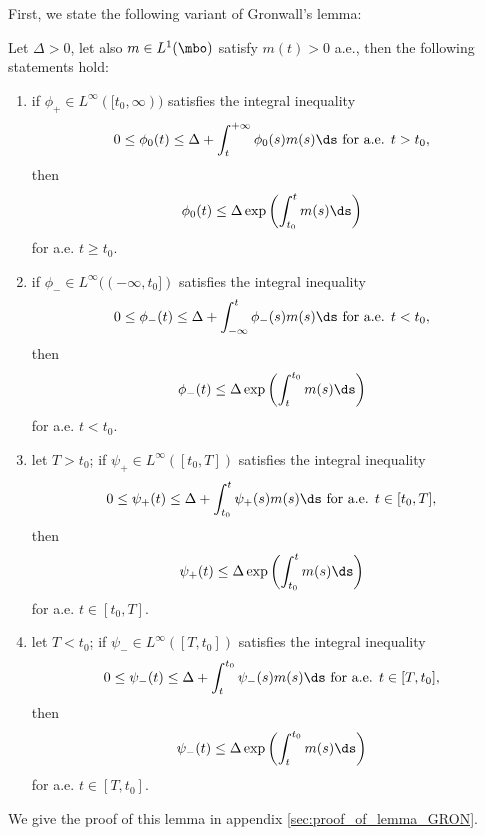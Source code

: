 First, we state the following variant of Gronwall's lemma:
\begin{lemma}
\label{le:gron} Let $\Delta>0$, let also $m\in L^1(\mbo)$ satisfy $m(t)>0$ a.e., then the following statements hold:
\begin{enumerate}
	\item
	if $\phi_+ \in L^{\infty}([t_0,\infty))$ satisfies the integral inequality 
	\[0\le \phi_0(t)\le \Delta+\int_{t}^{+\infty}\phi_0(s)m(s)\ds \mbox{ for a.e. }t>t_0,\]
	then
	\[\phi_0(t)\le \Delta \exp\left(\int_{t_0}^{t}m(s)\ds \right)\]
	for a.e. $t\ge t_0$.
	\item 
	if $\phi_- \in L^{\infty}((-\infty,t_0])$ satisfies the integral inequality 
	\[0\le \phi_-(t)\le \Delta+\int_{-\infty}^{t}\phi_-(s)m(s)\ds \mbox{ for a.e. }t<t_0,\]
	then
	\[\phi_-(t)\le \Delta \exp\left(\int_{t}^{t_0}m(s)\ds\right)\]
	for a.e. $t< t_0$.
	\item let $T>t_0$; if $\psi_+ \in L^{\infty}([t_0,T])$ satisfies the integral inequality 
	\[0\le \psi_+(t)\le \Delta+\int_{t_0}^{t}\psi_+(s)m(s)\ds \mbox{ for a.e. }t\in[t_0,T],\]
	then
	\[\psi_+(t)\le \Delta \exp\left(\int_{t_0}^{t}m(s)\ds\right)\]
	for a.e. $t\in[t_0,T]$.
	\item let $T<t_0$; if $\psi_- \in L^{\infty}([T,t_0])$ satisfies the integral inequality 
	\[0\le \psi_-(t)\le \Delta+\int_{t}^{t_0}\psi_-(s)m(s)\ds \mbox{ for a.e. }t\in[T,t_0],\]
	then
	\[\psi_-(t)\le \Delta \exp\left(\int_{t}^{t_0}m(s)\ds\right)\]
	for a.e. $t\in[T,t_0]$.
\end{enumerate}
\end{lemma} \noindent We give the proof of this lemma in  appendix \ref{sec:proof_of_lemma_GRON}.


